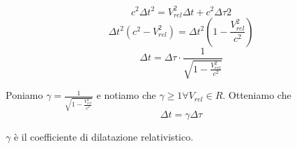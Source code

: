         \begin{equation*}
            c^2\Delta{t}^2=V_{rel}^2\Delta{t} + c^2\Delta\tau2
        \end{equation*}
        \begin{equation*}
            \Delta{t}^2(c^2-V_{rel}^2) = \Delta{t}^2(1-\frac{V_{rel}^2}{c^2})
        \end{equation*}
        \begin{equation*}
            \Delta{t}=\Delta\tau\cdot\frac{1}{\sqrt{1-\frac{V_{rel}^2}{c^2}}}
        \end{equation*}
        \par Poniamo $\gamma=\frac{1}{\sqrt{1-\frac{V_{rel}^2}{c^2}}}$ e notiamo che $\gamma \geq 1 \forall V_{rel} \in R$. Otteniamo che
        \begin{equation}\label{eq:53reltempi}
            \Delta{t} = \gamma\Delta\tau
        \end{equation}
	\par $\gamma$ è il coefficiente di dilatazione relativistico.
